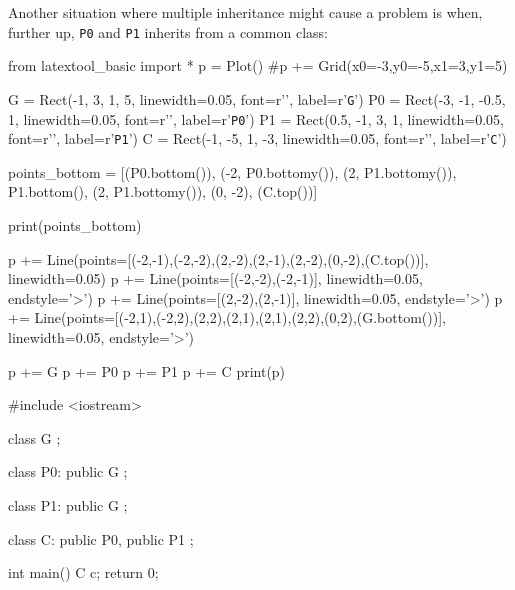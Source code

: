 Another situation where multiple inheritance might cause a problem is
when, further up, \verb!P0! and \verb!P1! inherits from a common class:
\begin{python}
from latextool_basic import *
p = Plot()
#p += Grid(x0=-3,y0=-5,x1=3,y1=5)

G = Rect(-1, 3, 1, 5, linewidth=0.05, font=r'\huge', label=r'\texttt{G}')
P0 = Rect(-3, -1, -0.5, 1, linewidth=0.05, font=r'\huge', label=r'\texttt{P0}')
P1 = Rect(0.5, -1, 3, 1, linewidth=0.05, font=r'\huge', label=r'\texttt{P1}')
C = Rect(-1, -5, 1, -3, linewidth=0.05, font=r'\huge', label=r'\texttt{C}')

points_bottom = [(P0.bottom()), (-2, P0.bottomy()), (2, P1.bottomy()), P1.bottom(), (2, P1.bottomy()), (0, -2), (C.top())]

print(points_bottom)

p += Line(points=[(-2,-1),(-2,-2),(2,-2),(2,-1),(2,-2),(0,-2),(C.top())], linewidth=0.05)
p += Line(points=[(-2,-2),(-2,-1)], linewidth=0.05, endstyle='>')
p += Line(points=[(2,-2),(2,-1)], linewidth=0.05, endstyle='>')
p += Line(points=[(-2,1),(-2,2),(2,2),(2,1),(2,1),(2,2),(0,2),(G.bottom())], linewidth=0.05, endstyle='>')


p += G
p += P0
p += P1
p += C
print(p)
\end{python}
\begin{console}
#include <iostream>

class G
{};

class P0: public G
{};

class P1: public G
{};

class C: public P0, public P1
{};

int main()
{   
    C c;
    return 0;
}
\end{console}

